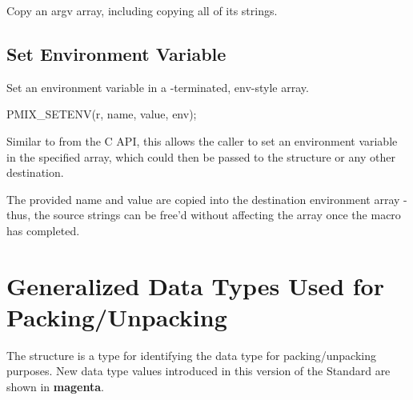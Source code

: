 \begin{arglist}
\end{arglist}

Copy an argv array, including copying all of its strings.


\subsection{Set Environment Variable}

\summary

Set an environment variable in a -terminated, env-style array.

\cspecificstart
\begin{codepar}
PMIX_SETENV(r, name, value, env);
\end{codepar}
\cspecificend


\begin{arglist}
\end{arglist}

\descr

Similar to  from the C API, this allows the caller to set an environment variable in the specified  array, which could then be passed to the  structure or any other destination.

\adviceuserstart
The provided name and value are copied into the destination environment array - thus, the source strings can be free'd without affecting the array once the macro has completed.
\adviceuserend


\section{Generalized Data Types Used for Packing/Unpacking}

The  structure is a  type for identifying the data type for packing/unpacking purposes. New data type values introduced in this version of the Standard are shown in \textbf{\color{magenta}magenta}.

